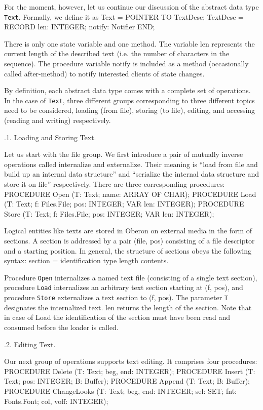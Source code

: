 For the moment, however, let us continue our discussion of the
abstract data type {\tt Text\/}. Formally, we define it as
\begintt
Text = POINTER TO TextDesc;
TextDesc = RECORD
  len: INTEGER;
  notify: Notifier
END;
\endtt

\noindent There is only one state variable and one method. The variable len
represents the current length of the described text (i.e. the number
of characters in the sequence). The procedure variable notify is
included as a method (occasionally called after-method) to notify
interested clients of state changes.

By definition, each abstract data type comes with a complete set of
operations. In the case of {\tt Text\/}, three different groups corresponding
to three different topics need to be considered, loading (from file),
storing (to file), editing, and accessing (reading and writing)
respectively.

.1. Loading and Storing Text.

Let us start with the file group. We first introduce a pair of
mutually inverse operations called internalize and externalize. Their
meaning is ``load from file and build up an internal data structure''
and ``serialize the internal data structure and store it on file''
respectively. There are three corresponding procedures:
\begintt
PROCEDURE Open (T: Text; name: ARRAY OF CHAR);
PROCEDURE Load (T: Text; f: Files.File; pos: INTEGER; VAR len: INTEGER);
PROCEDURE Store (T: Text; f: Files.File; pos: INTEGER; VAR len: INTEGER);
\endtt

\noindent Logical entities like texts are stored in Oberon on external media in
the form of sections. A section is addressed by a pair (file, pos)
consisting of a file descriptor and a starting position. In general,
the structure of sections obeys the following syntax:
\begintt
section = identification type length contents.
\endtt

\noindent Procedure {\tt Open\/} internalizes a named text file (consisting of a single
text section), procedure {\tt Load\/} internalizes an arbitrary text section
starting at (f, pos), and procedure {\tt Store\/} externalizes a text section
to (f, pos). The parameter {\tt T\/} designates the internalized text. len
returns the length of the section. Note that in case of Load the
identification of the section must have been read and consumed before
the loader is called.

.2. Editing Text.

Our next group of operations supports text editing. It comprises four procedures:
\begintt
PROCEDURE Delete (T: Text; beg, end: INTEGER);
PROCEDURE Insert (T: Text; pos: INTEGER; B: Buffer);
PROCEDURE Append (T: Text; B: Buffer);
PROCEDURE ChangeLooks (T: Text; beg, end: INTEGER; sel: SET; fnt: Fonts.Font; col, voff: INTEGER);
\endtt


